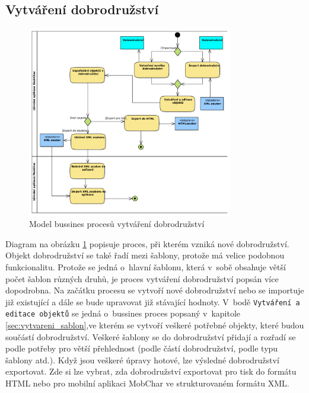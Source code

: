 \documentclass[thesis=B,czech]{resources/FITthesis}[2012/06/26]
\begin{document}
\subsection{Vytváření dobrodružství}
\begin{figure}\centering
	\includegraphics[width=0.8\textwidth]{images/business_dobrodruzstvi}
	\caption[Business proces vytváření dobrodružství]{Model bussines procesů vytváření dobrodružství}\label{fig:bp_dobrodruzsvi}
\end{figure}
Diagram na obrázku \ref{fig:bp_dobrodruzsvi} popisuje proces, při kterém vzniká nové dobrodružství. Objekt dobrodružství se také řadí mezi šablony, protože má velice podobnou funkcionalitu. Protože se jedná o~hlavní šablonu, která v~sobě obsahuje větší počet šablon různých druhů, je proces vytváření dobrodružství popsán více dopodrobna. Na začátku procesu se vytvoří nové dobrodružství nebo se importuje již existující a dále se bude upravovat již stávající hodnoty. V~bodě \texttt{Vytváření a editace objektů} se jedná o~bussines proces popsaný v~kapitole \ref{sec:vytvareni_sablon},ve kterém se vytvoří veškeré potřebné objekty, které budou součástí dobrodružství. Veškeré šablony se do dobrodružství přidají a rozřadí se podle potřeby pro větší přehlednost (podle částí dobrodružství, podle typu šablony atd.). Když jsou veškeré úpravy hotové, lze výsledné dobrodružství exportovat. Zde si lze vybrat, zda dobrodružství exportovat pro tisk do formátu HTML nebo pro mobilní aplikaci MobChar ve strukturovaném formátu XML.
\end{document}
